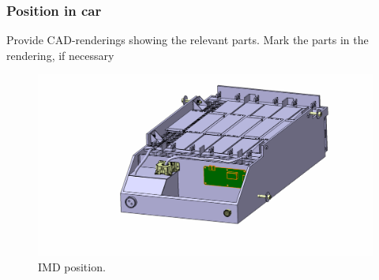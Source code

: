 \subsubsection{Position in car}
Provide CAD-renderings showing the relevant parts. Mark the parts in the rendering, if necessary

\begin{figure}[H]
	\centering
	\includegraphics[width=\textwidth]{./img/IMD-position.jpg}
	\caption{IMD position.}
	\label{fig:IMD-position}
\end{figure}
